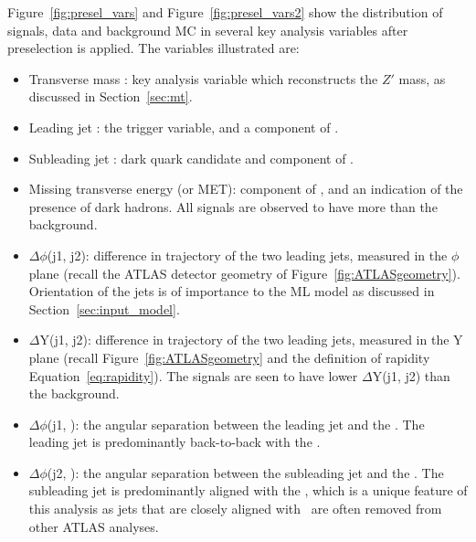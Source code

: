 Figure~\ref{fig:presel_vars} and Figure~\ref{fig:presel_vars2} show the distribution of signals, data and background MC in several key analysis variables after preselection is applied.
The variables illustrated are:
\begin{itemize}
\item Transverse mass \mt: key analysis variable which reconstructs the $Z'$ mass, as discussed in Section~\ref{sec:mt}.
\item Leading jet \pt: the trigger variable, and a component of \mt. 
\item Subleading jet \pt: dark quark candidate and component of \mt.
\item Missing transverse energy \met (or MET): component of \mt, and an indication of the presence of dark hadrons. All signals are observed to have more \met than the background.
\item $\Delta\phi$(j1, j2): difference in trajectory of the two leading jets, measured in the $\phi$ plane (recall the ATLAS detector geometry of Figure~\ref{fig:ATLASgeometry}). Orientation of the jets is of importance to the ML model as discussed in Section~\ref{sec:input_model}. 
\item $\Delta$Y(j1, j2): difference in trajectory of the two leading jets, measured in the Y plane (recall Figure~\ref{fig:ATLASgeometry} and the definition of rapidity Equation~\ref{eq:rapidity}). The signals are seen to have lower $\Delta$Y(j1, j2) than the background.
\item $\Delta\phi$(j1, \met): the angular separation between the leading jet and the \met. The leading jet is predominantly back-to-back with the \met.
\item $\Delta\phi$(j2, \met): the angular separation between the subleading jet and the \met. The subleading jet is predominantly aligned with the \met, which is a unique feature of this analysis as jets that are closely aligned with \met~are often removed from other ATLAS analyses.
\end{itemize}

